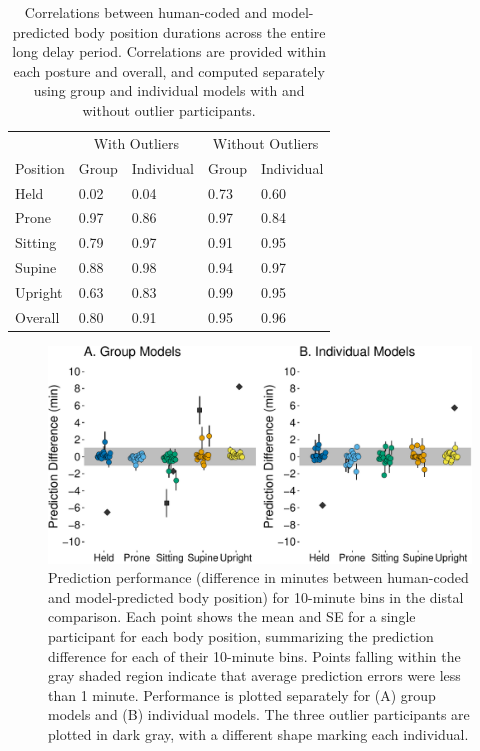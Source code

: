 \documentclass[
  man]{apa6}
\begin{document}
\begin{table}[tbp]

\begin{center}
\begin{threeparttable}

\caption{\label{tab:pt2overalltable}Correlations between human-coded and model-predicted body position durations across the entire long delay period. Correlations are provided within each posture and overall, and computed separately using group and individual models with and without outlier participants.}

\begin{tabular}{lllll}
\toprule
 & \multicolumn{2}{c}{With Outliers} & \multicolumn{2}{c}{Without Outliers} \\
\cmidrule(r){2-3} \cmidrule(r){4-5}
Position & Group & Individual & Group & Individual\\
\midrule
Held & 0.02 & 0.04 & 0.73 & 0.60\\
Prone & 0.97 & 0.86 & 0.97 & 0.84\\
Sitting & 0.79 & 0.97 & 0.91 & 0.95\\
Supine & 0.88 & 0.98 & 0.94 & 0.97\\
Upright & 0.63 & 0.83 & 0.99 & 0.95\\ \midrule
Overall & 0.80 & 0.91 & 0.95 & 0.96\\
\bottomrule
\end{tabular}

\end{threeparttable}
\end{center}

\end{table}

\begin{figure}

{\centering \includegraphics{manuscript_files/figure-latex/part2bins-1} 

}

\caption{Prediction performance (difference in minutes between human-coded and model-predicted body position) for 10-minute bins in the distal comparison. Each point shows the mean and SE for a single participant for each body position, summarizing the prediction difference for each of their 10-minute bins. Points falling within the gray shaded region indicate that average prediction errors were less than 1 minute. Performance is plotted separately for (A) group models and (B) individual models. The three outlier participants are plotted in dark gray, with a different shape marking each individual.}\label{fig:part2bins}
\end{figure}
\end{document}
